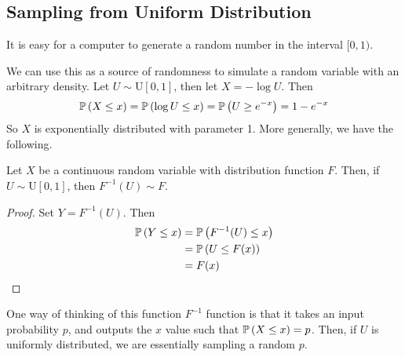 \subsection{Sampling from Uniform Distribution}
It is easy for a computer to generate a random number in the interval \([0, 1)\).

We can use this as a source of randomness to simulate a random variable with an arbitrary density.
Let \(U \sim \mathrm{U}[0, 1]\), then let \(X = -\log U\).
Then
\[
	\mathbb{P}\left({X \leq x}\right) = \mathbb{P}\left({\log U \leq x}\right) = \mathbb{P}\left({U \geq e^{-x}}\right) = 1-e^{-x}
\]
So \(X\) is exponentially distributed with parameter 1.
More generally, we have the following.
\begin{theorem}
	Let \(X\) be a continuous random variable with distribution function \(F\).
	Then, if \(U \sim \mathrm{U}[0, 1]\), then \(F^{-1}(U) \sim F\).
\end{theorem}
\begin{proof}
	Set \(Y = F^{-1}(U)\).
	Then
	\begin{align*}
		\mathbb{P}\left({Y \leq x}\right) & = \mathbb{P}\left({F^{-1}(U) \leq x}\right) \\
		                & = \mathbb{P}\left({U \leq F(x)}\right)      \\
		                & = F(x)
	\end{align*}
\end{proof}
\noindent One way of thinking of this function \(F^{-1}\) function is that it takes an input probability \(p\), and outputs the \(x\) value such that \(\mathbb{P}\left({X \leq x}\right) = p\).
Then, if \(U\) is uniformly distributed, we are essentially sampling a random \(p\).

